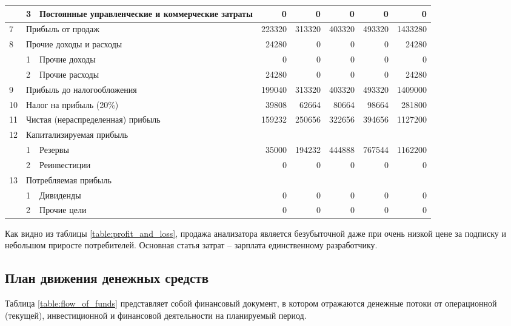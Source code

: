\begin{table}[!h]
{\begin{tabular}{l|l|l|r|r|r|r|r|}
				& 3 & Постоянные управленческие и коммерческие затраты & 0 & 0 & 0 & 0 & 0 \\ \hline
				\multicolumn{1}{|l|}{7} & \multicolumn{2}{l|}{Прибыль от продаж} & 223320 & 313320 & 403320 & 493320 & 1433280 \\ \hline
				\multicolumn{1}{|l|}{8} & \multicolumn{2}{l|}{Прочие доходы и расходы} & 24280 & 0 & 0 & 0 & 24280 \\ \hline
				& 1 & Прочие доходы & 0 & 0 & 0 & 0 & 0 \\ \cline{2-8} 
				& 2 & Прочие расходы & 24280 & 0 & 0 & 0 & 24280 \\ \hline
				\multicolumn{1}{|l|}{9} & \multicolumn{2}{l|}{Прибыль до налогообложения} & 199040 & 313320 & 403320 & 493320 & 1409000  \\ \hline
				\multicolumn{1}{|l|}{10} & \multicolumn{2}{l|}{Налог на прибыль (20\%)} & 39808 & 62664 & 80664 & 98664 & 281800 \\ \hline
				\multicolumn{1}{|l|}{11} & \multicolumn{2}{l|}{Чистая (нераспределенная) прибыль} & 159232 & 250656 & 322656 & 394656 & 1127200 \\ \hline
				\multicolumn{1}{|l|}{12} & \multicolumn{2}{l|}{Капитализируемая прибыль} & \multicolumn{5}{l|}{} \\ \hline
				& 1 & Резервы & 35000 & 194232 & 444888 & 767544 & 1162200 \\ \cline{2-8} 
				& 2 & Реинвестиции & 0 & 0 & 0 & 0 & 0 \\ \hline
				\multicolumn{1}{|l|}{13} & \multicolumn{2}{l|}{Потребляемая прибыль} & \multicolumn{5}{l|}{} \\ \hline
				& 1 & Дивиденды & 0 & 0 & 0 & 0 & 0 \\ \cline{2-8} 
				& 2 & Прочие цели & 0 & 0 & 0 & 0 & 0 \\ \cline{2-8} 
			\end{tabular}%
		}
	\end{table}
	Как видно из таблицы \ref{table:profit_and_loss}, продажа анализатора является безубыточной даже при очень низкой цене за подписку и небольшом приросте потребителей. Основная статья затрат -- зарплата единственному разработчику.

\subsection{План движения денежных средств} 
	Таблица \ref{table:flow_of_funds} представляет собой финансовый документ, в котором отражаются денежные потоки от операционной (текущей), инвестиционной и финансовой деятельности на планируемый период.

